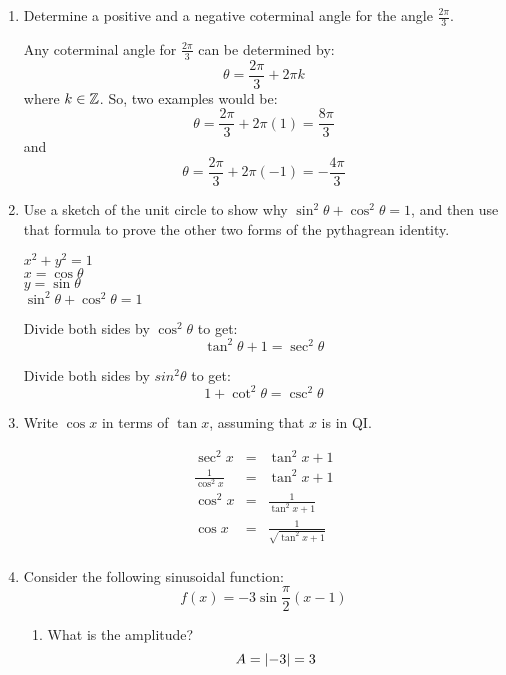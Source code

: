 \documentclass[letterpaper,12pt,fleqn]{article}
\renewcommand{\o}{\theta}
\begin{document}
\begin{enumerate}
\item Determine a positive and a negative coterminal angle for the angle
  $\frac{2\pi}{3}$.

  Any coterminal angle for $\frac{2\pi}{3}$ can be determined by:
  \[\o=\frac{2\pi}{3}+2\pi k\]
  where $k\in\mathbb{Z}$. So, two examples would be:
  \[\o=\frac{2\pi}{3}+2\pi(1)=\frac{8\pi}{3}\]
  and
  \[\o=\frac{2\pi}{3}+2\pi(-1)=-\frac{4\pi}{3}\]

\item Use a sketch of the unit circle to show why $\sin^2\o+\cos^2\o=1$, and
  then use that formula to prove the other two forms of the pythagrean identity.

\begin{minipage}{3in}
\end{minipage}
\begin{minipage}{3in}
$x^2+y^2=1$ \\
$x=\cos\o$ \\
$y=\sin\o$ \\
$\sin^2\o+\cos^2\o=1$
\end{minipage}

Divide both sides by $\cos^2\o$ to get:
\[\tan^2\o+1=\sec^2\o\]

Divide both sides by $sin^2\o$ to get:
\[1+\cot^2\o=\csc^2\o\]

\item Write $\cos{x}$ in terms of $\tan{x}$, assuming that $x$ is in QI.

  \begin{eqnarray*}
    \sec^2{x} &=& \tan^2x+1 \\
    \frac{1}{\cos^2x} &=& \tan^2x+1 \\
    \cos^2x &=& \frac{1}{\tan^2x+1} \\
    \cos{x} &=& \frac{1}{\sqrt{\tan^2x+1}} \\
  \end{eqnarray*}

\item Consider the following sinusoidal function:
\[f(x)=-3\sin\frac{\pi}{2}(x-1)\]
\begin{enumerate}
\item What is the amplitude?
  \[A=\lvert-3\rvert=3\]
  

\end{enumerate}
\end{enumerate}
\end{document}
